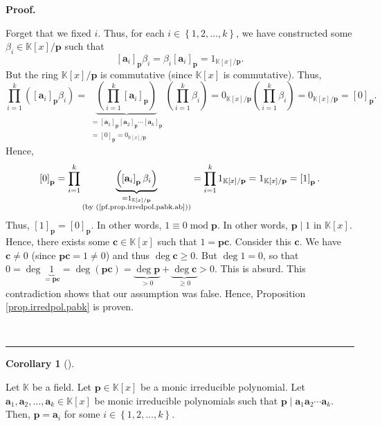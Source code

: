 \documentclass[numbers=enddot,12pt,final,onecolumn,notitlepage]{scrartcl}%
\theoremstyle{definition}
\newtheorem{coro}[theo]{Corollary}
\newenvironment{corollary}[1][]
{\begin{coro}[#1]\begin{leftbar}}
{\end{leftbar}\end{coro}}
\newenvironment{fineprint}{\begin{small}}{\end{small}}
\newenvironment{proof}[1][Proof]{\noindent\textbf{#1.} }{\ \rule{0.5em}{0.5em}}
\let\prodnonlimits\prod
\renewcommand{\prod}{\prodnonlimits\limits}
\begin{document}
\begin{proof}
\begin{fineprint}
Forget that we fixed $i$. Thus, for each $i\in\left\{  1,2,\ldots,k\right\}
$, we have constructed some $\beta_{i}\in\mathbb{K}\left[  x\right]
/\mathbf{p}$ such that
\begin{equation}
\left[  \mathbf{a}_{i}\right]  _{\mathbf{p}}\beta_{i}=\beta_{i}\left[
\mathbf{a}_{i}\right]  _{\mathbf{p}}=1_{\mathbb{K}\left[  x\right]
/\mathbf{p}}. \label{pf.prop.irredpol.pabk.ab}%
\end{equation}
But the ring $\mathbb{K}\left[  x\right]  /\mathbf{p}$ is commutative (since
$\mathbb{K}\left[  x\right]  $ is commutative). Thus,%
\[
\prod_{i=1}^{k}\left(  \left[  \mathbf{a}_{i}\right]  _{\mathbf{p}}\beta
_{i}\right)  =\underbrace{\left(  \prod_{i=1}^{k}\left[  \mathbf{a}%
_{i}\right]  _{\mathbf{p}}\right)  }_{\substack{=\left[  \mathbf{a}%
_{1}\right]  _{\mathbf{p}}\left[  \mathbf{a}_{2}\right]  _{\mathbf{p}}%
\cdots\left[  \mathbf{a}_{k}\right]  _{\mathbf{p}}\\=\left[  0\right]
_{\mathbf{p}}=0_{\mathbb{K}\left[  x\right]  /\mathbf{p}}}}\left(  \prod
_{i=1}^{k}\beta_{i}\right)  =0_{\mathbb{K}\left[  x\right]  /\mathbf{p}%
}\left(  \prod_{i=1}^{k}\beta_{i}\right)  =0_{\mathbb{K}\left[  x\right]
/\mathbf{p}}=\left[  0\right]  _{\mathbf{p}}.
\]
Hence,%
\[
\left[  0\right]  _{\mathbf{p}}=\prod_{i=1}^{k}\underbrace{\left(  \left[
\mathbf{a}_{i}\right]  _{\mathbf{p}}\beta_{i}\right)  }%
_{\substack{=1_{\mathbb{K}\left[  x\right]  /\mathbf{p}}\\\text{(by
(\ref{pf.prop.irredpol.pabk.ab}))}}}=\prod_{i=1}^{k}1_{\mathbb{K}\left[
x\right]  /\mathbf{p}}=1_{\mathbb{K}\left[  x\right]  /\mathbf{p}}=\left[
1\right]  _{\mathbf{p}}.
\]
Thus, $\left[  1\right]  _{\mathbf{p}}=\left[  0\right]  _{\mathbf{p}}$. In
other words, $1\equiv0\operatorname{mod}\mathbf{p}$. In other words,
$\mathbf{p}\mid1$ in $\mathbb{K}\left[  x\right]  $. Hence, there exists some
$\mathbf{c}\in\mathbb{K}\left[  x\right]  $ such that $1=\mathbf{pc}$.
Consider this $\mathbf{c}$. We have $\mathbf{c}\neq0$ (since $\mathbf{pc}%
=1\neq0$) and thus $\deg\mathbf{c}\geq0$. But $\deg1=0$, so that
$0=\deg\underbrace{1}_{=\mathbf{pc}}=\deg\left(  \mathbf{pc}\right)
=\underbrace{\deg\mathbf{p}}_{>0}+\underbrace{\deg\mathbf{c}}_{\geq0}>0$. This
is absurd. This contradiction shows that our assumption was false. Hence,
Proposition \ref{prop.irredpol.pabk} is proven.
\end{fineprint}
\end{proof}

\begin{corollary}
\label{cor.irredpol.pabk2}Let $\mathbb{K}$ be a field. Let $\mathbf{p}%
\in\mathbb{K}\left[  x\right]  $ be a monic irreducible polynomial. Let
$\mathbf{a}_{1},\mathbf{a}_{2},\ldots,\mathbf{a}_{k}\in\mathbb{K}\left[
x\right]  $ be monic irreducible polynomials such that $\mathbf{p}%
\mid\mathbf{a}_{1}\mathbf{a}_{2}\cdots\mathbf{a}_{k}$. Then, $\mathbf{p}%
=\mathbf{a}_{i}$ for some $i\in\left\{  1,2,\ldots,k\right\}  $.
\end{corollary}
\end{document}
